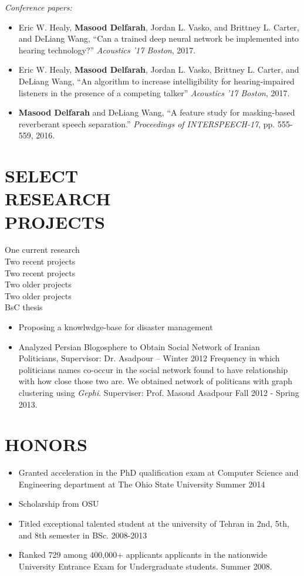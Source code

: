 \documentclass[margin, 10pt]{res}
\begin{document}
\begin{resume}
\textit{Conference papers:}
\begin{itemize}

\item Eric W. Healy, \textbf{Masood Delfarah}, Jordan L. Vasko, and Brittney L. Carter, and DeLiang Wang, ``Can a trained deep neural network be implemented into hearing technology?'' \textit{Acoustics ’17 Boston}, 2017.
\item Eric W. Healy, \textbf{Masood Delfarah}, Jordan L. Vasko, Brittney L. Carter, and DeLiang Wang, ``An algorithm to increase intelligibility for hearing-impaired listeners in the presence of a competing talker'' \textit{Acoustics ’17 Boston}, 2017.
\item \textbf{Masood Delfarah} and DeLiang Wang, ``A feature study for masking-based reverberant speech separation.'' \textit{Proceedings of INTERSPEECH-17}, pp. 555-559, 2016.

\end{itemize}

\section{SELECT \\ RESEARCH \\ PROJECTS}
One current research\\
Two recent projects\\
Two recent projects\\
Two older projects\\
Two older projects\\
BsC thesis
\begin{itemize}

\item Proposing a knowlwdge-base for disaster management

\item Analyzed Persian Blogosphere to Obtain Social Network of Iranian Politicians, Supervisor: Dr. Asadpour – Winter 2012 
Frequency in which politicians names co-occur in the social network found to have relationship with how close those two are. We obtained network of politicans with graph clustering using \textit{Gephi}. Superviser: Prof. Masoud Asadpour \hfill Fall 2012 - Spring 2013.
\end{itemize}


\section{HONORS}
\begin{itemize}
\item Granted acceleration in the PhD qualification exam at Computer Science and Engineering department at The Ohio State University \hfill Summer 2014
\item Scholarship from OSU
\item Titled exceptional talented student at the university of Tehran in 2nd, 5th, and 8th semester in BSc. \hfill 2008-2013
\item Ranked 729 among 400,000+ applicants applicants in the nationwide University
Entrance Exam for Undergraduate students. \hfill Summer 2008.
\end{itemize}


\end{resume}
\end{document}
